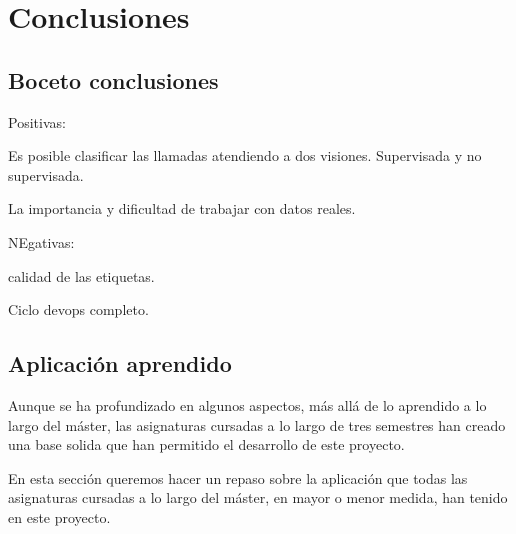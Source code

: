 \chapter{Conclusiones}
\label{chapter:conclusiones}


\section{Boceto conclusiones}

Positivas: 

Es posible clasificar las llamadas atendiendo a dos visiones.  Supervisada y no supervisada. 

La importancia y dificultad de trabajar con datos reales. 

NEgativas: 

calidad de las etiquetas. 

Ciclo devops completo. 




\section{Aplicación aprendido}

Aunque se ha profundizado en algunos aspectos, más allá de lo aprendido a lo largo del máster, las asignaturas cursadas a lo largo de tres semestres han creado una base solida que han permitido el desarrollo de este proyecto.

En esta sección queremos hacer un repaso sobre la aplicación que todas las asignaturas cursadas a lo largo del máster, en mayor o menor medida, han tenido en este proyecto. 


